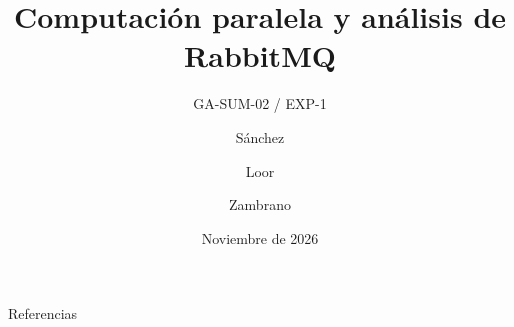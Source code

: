 \documentclass[aspectratio=169,11pt]{beamer}
\title{Computación paralela y análisis de RabbitMQ}
\subtitle{GA-SUM-02 / EXP-1}
\author{Sánchez \and Loor \and Zambrano}
\institute{Universidad Técnica Estatal de Quevedo}
\date{Noviembre de 2026}
\begin{document}
\begin{frame}
    \titlepage
\end{frame}












\begin{frame}[allowframebreaks]{Referencias}
    \printbibliography[heading=none]
\end{frame}
\end{document}
